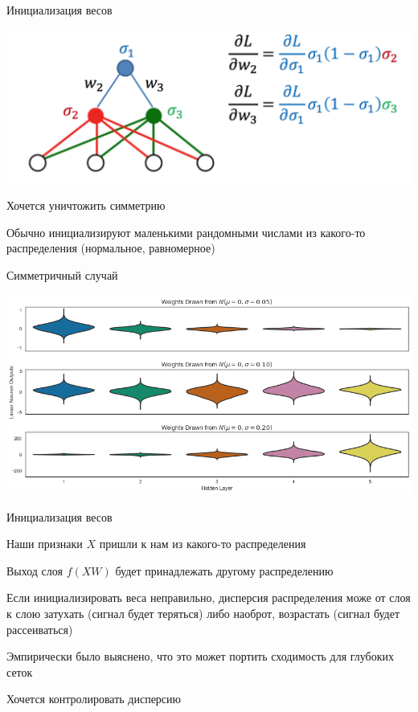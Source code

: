 \documentclass[notes,12pt, aspectratio=169]{beamer}
\newenvironment{wideitemize}{\itemize\addtolength{\itemsep}{10pt}}{\enditemize}
\begin{document}
\begin{frame}{Инициализация весов}
\begin{center}
	\includegraphics[width=.6\linewidth]{init1.png}
\end{center}
\begin{wideitemize}
	\item  Хочется уничтожить симметрию
	\item  Обычно инициализируют маленькими рандомными числами из какого-то распределения (нормальное, равномерное)
\end{wideitemize}
\end{frame}


\begin{frame}{Симметричный случай}
\begin{center}
	\includegraphics[width=.9\linewidth]{init_sim.png}
\end{center}
\end{frame}


\begin{frame}{Инициализация весов}
	\begin{wideitemize}
		\item Наши признаки $X$ пришли к нам из какого-то распределения 
		\item Выход слоя $f(XW)$ будет принадлежать другому распределению 
		\item Если инициализировать веса неправильно, дисперсия распределения може от слоя к слою затухать (сигнал будет теряться) либо наоброт, возрастать (сигнал будет рассеиваться)
		\item Эмпирически было выяснено, что это может портить сходимость для глубоких сеток
		\item  \alert{Хочется контролировать дисперсию} 
	\end{wideitemize}
\end{frame}
\end{document}
